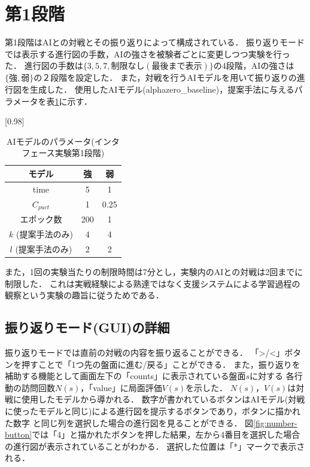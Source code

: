 \section{第1段階}
第1段階はAIとの対戦とその振り返りによって構成されている．
振り返りモードでは表示する進行図の手数，AIの強さを被験者ごとに変更しつつ実験を行った．
進行図の手数は$\{3, 5, 7, 制限なし(最後まで表示)\}$の4段階，AIの強さは$\{強,弱\}$の２段階を設定した．
また，対戦を行うAIモデルを用いて振り返りの進行図を生成した．
使用したAIモデル(alphazero\_baseline)，提案手法に与えるパラメータを表\ref{table:param-system}に示す．
\begin{table}[H]
	\caption{AIモデルのパラメータ(インタフェース実験第1段階)}
    \label{table:param-system}
	\centering
	\scalebox{0.98}[0.98]{
		\begin{tabular}{c|c|c}
			モデル&強&弱\\\hline
			time    & 5 & 1 \\ 
			$C_{puct}$ & 1   & 0.25 \\
            エポック数 & 200 & 1 \\
			$k$ (提案手法のみ)     & 4 & 4 \\
			$l$ (提案手法のみ)     & 2 & 2 \\

		\end{tabular}
	}
	
\end{table}
また，1回の実験当たりの制限時間は7分とし，実験内のAIとの対戦は2回までに制限した．
これは実戦経験による熟達ではなく支援システムによる学習過程の観察という実験の趣旨に従うためである．
\subsection{振り返りモード(GUI)の詳細}
振り返りモードでは直前の対戦の内容を振り返ることができる．
「>/<」ボタンを押すことで「1つ先の盤面に進む/戻る」ことができる．
また，振り返りを補助する機能として画面左下の「counts」に表示されている盤面$s$に対する
各行動の訪問回数$N(s)$，「value」に局面評価$V(s)$を示した．
$N(s)，V(s)$は対戦に使用したモデルから導かれる．
数字が書かれているボタンはAIモデル(対戦に使ったモデルと同じ)による進行図を提示するボタンであり，ボタンに描かれた数字
と同じ列を選択した場合の進行図を見ることができる．
図\ref{fig:number-button}では「4」と描かれたボタンを押した結果，左から4番目を選択した場合の進行図が表示されていることがわかる．
選択した位置は「*」マークで表示される．



